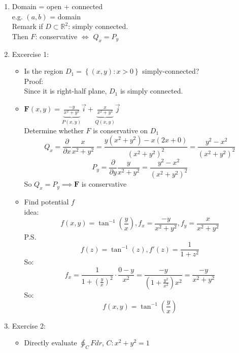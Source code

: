 \documentclass[../main.tex]{subfiles}
\begin{document}
\begin{enumerate}
\begin{itemize}
So $\implies Q_x - P_y = 0$
\end{itemize}
\item Domain = open + connected\\
e.g. $(a,b)$ = domain\\
Remark if $D\subset \mathbb{R}^2$: simply connected.\\
Then $F$: conservative $\Leftrightarrow$ $Q_x = P_y$
\item Excercise 1:
\begin{itemize}
\item Is the region $D_1= \left\{(x,y) : x>0
\right\}$ simply-connected?\\
Proof:\\
Since it is right-half plane, $D_1$ is simply connected.
\item $\bm{F}(x,y) = \underbrace{\frac{-y}{x^2+y^2}}_{P(x,y)}\vec{i} + \underbrace{\frac{x}{x^2+y^2}}_{Q(x,y)}\vec{j}$\\
Determine whether $F$ is conservative on $D_1$
\begin{equation}
Q_x = \frac{\partial }{\partial x} \frac{x}{x^2+y^2} = \frac{
y(x^2+y^2)-x(2x+0)
}{(x^2+y^2)^2} = \frac{y^2-x^2}{(x^2+y^2)^2}
\end{equation}
\begin{equation}
P_y = \frac{\partial }{\partial y} \frac{y}{x^2+y^2} = \frac{y^2-x^2}{(x^2+y^2)^2}
\end{equation}
So $Q_x = P_y \implies \bm{F}$ is conservative
\item Find potential $f$\\
idea:
\begin{equation}
f(x,y) = \tan^{-1}\left(\frac{y}{x}\right), f_x = \frac{-y}{x^2+y^2}, f_y = \frac{x}{x^2+y^2}
\end{equation}
P.S.
\begin{equation}
f(z) = \tan^{-1}(z), f'(z) = \frac{1}{1+z^2}
\end{equation}
So:
\begin{equation}
f_x = \frac{1}{1+\left(\frac{y}{x}\right)^2}\cdot\frac{0-y}{x^2} = \frac{-y}{\left(1+\frac{y^2}{x^2}\right)x^2} = \frac{-y}{x^2+y^2}
\end{equation}
So:
\begin{equation}
f(x,y) = \tan^{-1}\left(\frac{y}{x}\right)
\end{equation}
\end{itemize}
\item Exercise 2:
\begin{itemize}
\item Directly evaluate $\ointctrclockwise_C Fdr$, $C:x^2+y^2 = 1$\\

\end{itemize}
\end{enumerate}
\end{document}
